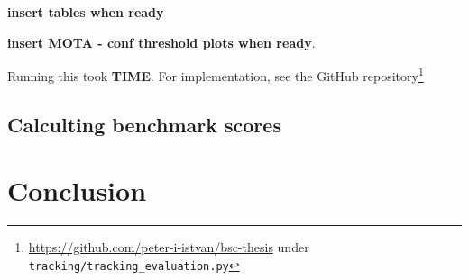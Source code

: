 \textbf{insert tables when ready}

\textbf{insert MOTA - conf threshold plots when ready}.

Running this took \textbf{TIME}. For implementation, see the GitHub repository\footnote{\url{https://github.com/peter-i-istvan/bsc-thesis} under \texttt{tracking/tracking\_evaluation.py}}

\subsection{Calculting benchmark scores}

\section{Conclusion}











